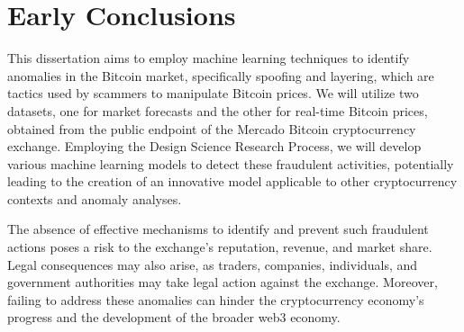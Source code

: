 \section{Early Conclusions}
This dissertation aims to employ machine learning techniques to identify anomalies in the Bitcoin market, specifically spoofing and layering, which are tactics used by scammers to manipulate Bitcoin prices. We will utilize two datasets, one for market forecasts and the other for real-time Bitcoin prices, obtained from the public endpoint of the Mercado Bitcoin cryptocurrency exchange. Employing the Design Science Research Process, we will develop various machine learning models to detect these fraudulent activities, potentially leading to the creation of an innovative model applicable to other cryptocurrency contexts and anomaly analyses.

The absence of effective mechanisms to identify and prevent such fraudulent actions poses a risk to the exchange's reputation, revenue, and market share. Legal consequences may also arise, as traders, companies, individuals, and government authorities may take legal action against the exchange. Moreover, failing to address these anomalies can hinder the cryptocurrency economy's progress and the development of the broader web3 economy.
